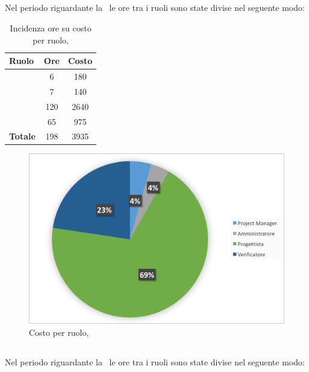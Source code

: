 \newpage
\subsection{\PA}
Nel periodo riguardante la \PA\ le ore tra i ruoli sono state divise nel seguente modo:

\begin{table}[h]
	\begin{center}
		\begin{tabular}{|l|c|c|}
			\hline
			\textbf{Ruolo}	& \textbf{Ore} &	\textbf{Costo}	 \\
			\hline
			\textit{\Pm}	&	6	&	180\\
			\hline
			\textit{\Am}	&	7	&	140\\
			\hline
			\textit{\Prog}	&	120	&	2640\\
			\hline
			\textit{\Ver}	&	65	&	975\\
			\hline
			\textbf{Totale}	&	198	&	3935\\
			\hline
		\end{tabular}
	\end{center}
	\caption{Incidenza ore su costo per ruolo, \PA}
\end{table}

\begin{figure}[H]
	\centering 
	\includegraphics[scale=0.7]{Immagini/GraficiTorteSezione6/PA.png}
	\caption{Costo per ruolo, \PA}
\end{figure}

\newpage
\subsection{\PD}
Nel periodo riguardante la \PD\ le ore tra i ruoli sono state divise nel seguente modo:

